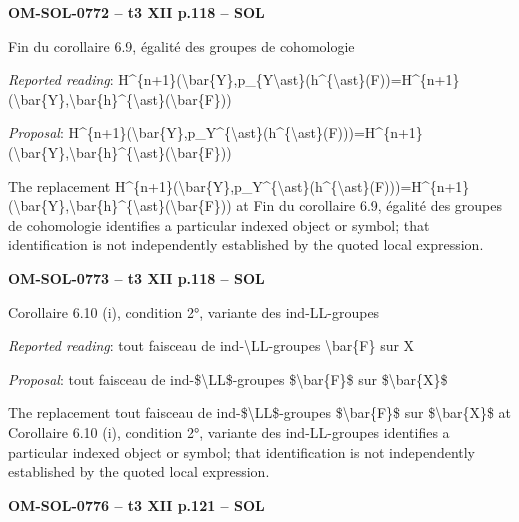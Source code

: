 \par\noindent\textbf{OM-SOL-0772 -- t3 XII p.118 -- SOL}\par
Fin du corollaire 6.9, égalité des groupes de cohomologie\par
\emph{Reported reading}: H\textasciicircum{}\{n+1\}(\textbackslash{}bar\{Y\},p\_\{Y\textbackslash{}ast\}(h\textasciicircum{}\{\textbackslash{}ast\}(F))=\allowbreak H\textasciicircum{}\{n+1\}(\textbackslash{}bar\{Y\},\textbackslash{}bar\{h\}\textasciicircum{}\{\textbackslash{}ast\}(\textbackslash{}bar\{F\}))\par
\emph{Proposal}: H\textasciicircum{}\{n+1\}(\textbackslash{}bar\{Y\},p\_Y\textasciicircum{}\{\textbackslash{}ast\}(h\textasciicircum{}\{\textbackslash{}ast\}(F)))=\allowbreak H\textasciicircum{}\{n+1\}(\textbackslash{}bar\{Y\},\textbackslash{}bar\{h\}\textasciicircum{}\{\textbackslash{}ast\}(\textbackslash{}bar\{F\}))\par
The replacement H\textasciicircum{}\{n+1\}(\textbackslash{}bar\{Y\},p\_Y\textasciicircum{}\{\textbackslash{}ast\}(h\textasciicircum{}\{\textbackslash{}ast\}(F)))=\allowbreak H\textasciicircum{}\{n+1\}(\textbackslash{}bar\{Y\},\textbackslash{}bar\{h\}\textasciicircum{}\{\textbackslash{}ast\}(\textbackslash{}bar\{F\})) at Fin du corollaire 6.9, égalité des groupes de cohomologie identifies a particular indexed object or symbol; that identification is not independently established by the quoted local expression.\par
\par\noindent\textbf{OM-SOL-0773 -- t3 XII p.118 -- SOL}\par
Corollaire 6.10 (i), condition 2°, variante des ind-LL-groupes\par
\emph{Reported reading}: tout faisceau de ind-\textbackslash{}LL-groupes \textbackslash{}bar\{F\} sur X\par
\emph{Proposal}: tout faisceau de ind-\$\textbackslash{}LL\$-groupes \$\textbackslash{}bar\{F\}\$ sur \$\textbackslash{}bar\{X\}\$\par
The replacement tout faisceau de ind-\$\textbackslash{}LL\$-groupes \$\textbackslash{}bar\{F\}\$ sur \$\textbackslash{}bar\{X\}\$ at Corollaire 6.10 (i), condition 2°, variante des ind-LL-groupes identifies a particular indexed object or symbol; that identification is not independently established by the quoted local expression.\par
\par\noindent\textbf{OM-SOL-0776 -- t3 XII p.121 -- SOL}\par
